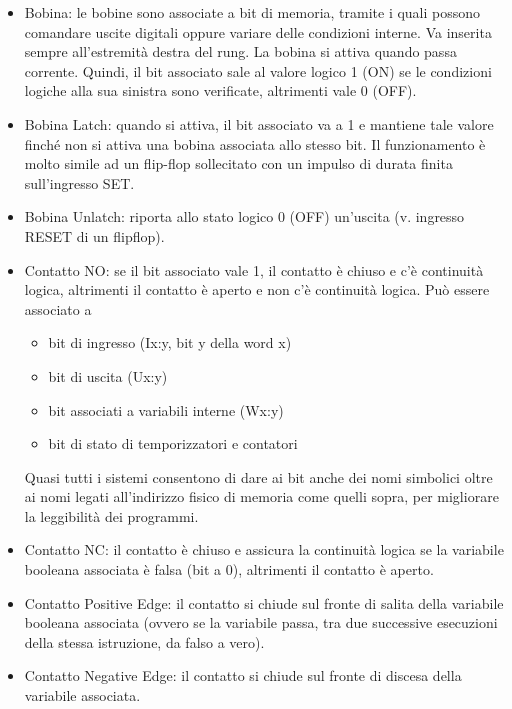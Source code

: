 \documentclass[12pt, a4paper, oneside]{book}
\begin{document}
\begin{itemize}
	
	\item Bobina: le bobine sono associate a bit di memoria, tramite i quali possono comandare uscite digitali oppure variare delle condizioni interne. Va inserita sempre all'estremità destra del rung. La bobina si attiva quando passa corrente. Quindi, il bit associato sale al valore logico 1 (ON) se le condizioni logiche alla sua sinistra sono verificate, altrimenti vale 0 (OFF).
	
	\item Bobina Latch: quando si attiva, il bit associato va a 1 e mantiene tale valore finché non si attiva una bobina associata allo stesso bit. Il funzionamento è molto simile ad un flip-flop sollecitato con un impulso di durata finita sull'ingresso SET. 
	
	\item Bobina Unlatch: riporta allo stato logico 0 (OFF) un'uscita (v. ingresso RESET di un flipflop).
	
	\item Contatto NO: se il bit associato vale 1, il contatto è chiuso e c'è continuità logica,
	altrimenti il contatto è aperto e non c'è continuità logica.
	Può essere associato a
	\begin{itemize}
	\item bit di ingresso (Ix:y, bit y della word x)
	\item bit di uscita (Ux:y)
	\item bit associati a variabili interne (Wx:y)
	\item bit di stato di temporizzatori e contatori
	\end{itemize}
	Quasi tutti i sistemi consentono di dare ai bit anche dei nomi simbolici oltre ai nomi legati all'indirizzo fisico di memoria come quelli sopra, per migliorare la leggibilità dei programmi. 
	
	\item Contatto NC: il contatto è chiuso e assicura la continuità logica se la variabile booleana associata è falsa (bit a 0), altrimenti il contatto è aperto. 
	
	\item Contatto Positive Edge: il contatto si chiude sul fronte di salita della variabile booleana associata (ovvero se la variabile passa, tra due successive esecuzioni
	della stessa istruzione, da falso a vero). 
	
	\item Contatto Negative Edge: il contatto si chiude sul fronte di discesa della variabile associata. 
	

\end{itemize}
\end{document}
